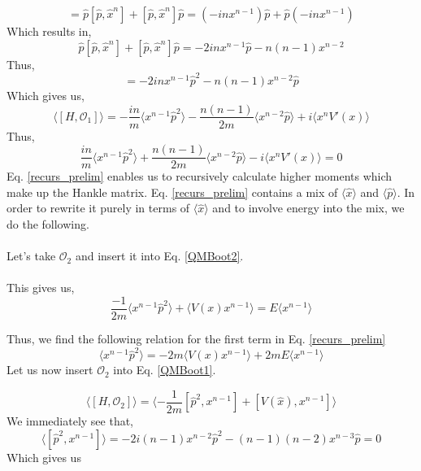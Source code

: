 \documentclass{article}
\theoremstyle{definition}
\begin{document}
\begin{equation}
 [\hat{p}^{2},x^{n}] = \hat{p} [\hat{p},\hat{x}^{n}] + [\hat{p},\hat{x}^{n}]\hat{p} = (- i n x^{n-1} )\hat{p} + \hat{p}(-i n x^{n-1} )
\end{equation}
Which results in,
\begin{equation}
\hat{p} [\hat{p},\hat{x}^{n}] + [\hat{p},\hat{x}^{n}]\hat{p} = - 2i n x^{n-1}\hat{p} - n(n-1) x^{n-2} 
\end{equation}
Thus, 
\begin{equation}
 [\hat{p}^{2},x^{n}]= - 2i n x^{n-1}\hat{p}^{2} - n(n-1) x^{n-2}\hat{p} 
\end{equation}
Which gives us, 
\begin{equation}
     \langle [H,\mathcal{O}_{1}] \rangle = -\frac{in}{m}\langle x^{n-1}\hat{p}^{2}\rangle- \frac{n(n-1)}{2m} \langle x^{n-2}\hat{p}\rangle + i\langle x^{n}V'(x)\rangle
\end{equation}
Thus, 
\begin{equation}\label{recurs_prelim}
     \frac{in}{m}\langle x^{n-1}\hat{p}^{2}\rangle+ \frac{n(n-1)}{2m} \langle x^{n-2}\hat{p}\rangle - i\langle x^{n}V'(x)\rangle = 0
\end{equation}
Eq. \eqref{recurs_prelim} enables us to recursively calculate higher moments which make up the Hankle matrix. Eq. \eqref{recurs_prelim} contains a mix of $\langle \hat{x}\rangle$ and $\langle \hat{p}\rangle$. In order to rewrite it purely in terms of $\langle \hat{x}\rangle$ and to involve energy into the mix, we do the following. \\
\\
Let's take $\mathcal{O}_{2}$ and insert it into Eq. \eqref{QMBoot2}.\\
\\
This gives us, 
\begin{equation}
 \frac{-1}{2m} \langle  x^{n-1}\hat{p}^{2} \rangle + \langle V(x)x^{n-1} \rangle= E\langle x^{n-1}\rangle
\end{equation}

Thus, we find the following relation for  the first term in Eq. \eqref{recurs_prelim}
\begin{equation}
 \langle  x^{n-1}\hat{p}^{2} \rangle =-2m\langle V(x)x^{n-1} \rangle + 2mE\langle x^{n-1}\rangle
\end{equation}
Let us now insert $\mathcal{O}_{2}$ into Eq. \eqref{QMBoot1}. 

\begin{equation}
      \langle [H,\mathcal{O}_{2}] \rangle = \langle -\frac{1}{2m}[\hat{p}^{2},x^{n-1}] + [V(\hat{x}),x^{n-1}]\rangle
\end{equation}
We immediately see that, 
\begin{equation}
      \langle[\hat{p}^{2},x^{n-1}]\rangle =- 2i (n-1) x^{n-2}\hat{p}^{2} - (n-1)(n-2) x^{n-3}\hat{p} = 0
\end{equation}
Which gives us 
\end{document}
